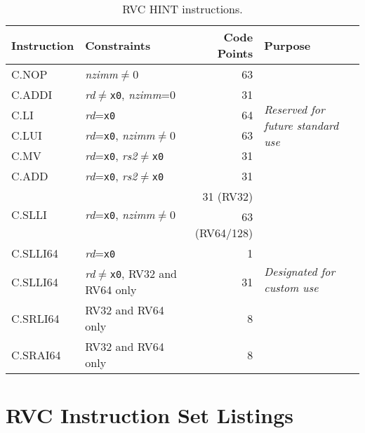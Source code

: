 \begin{table}[hbt]
\centering
\begin{tabular}{|l|l|r|l|}
  \hline
  Instruction             & Constraints                                 & Code Points & Purpose \\ \hline \hline
  C.NOP                   & {\em nzimm}$\neq$0                          & 63          & \multirow{6}{*}{\em Reserved for future standard use} \\ \cline{1-3}
  C.ADDI                  & {\em rd}$\neq${\tt x0}, {\em nzimm}=0       & 31          & \\ \cline{1-3}
  C.LI                    & {\em rd}={\tt x0}                           & 64          & \\ \cline{1-3}
  C.LUI                   & {\em rd}={\tt x0}, {\em nzimm}$\neq$0       & 63          & \\ \cline{1-3}
  C.MV                    & {\em rd}={\tt x0}, {\em rs2}$\neq${\tt x0}  & 31          & \\ \cline{1-3}
  C.ADD                   & {\em rd}={\tt x0}, {\em rs2}$\neq${\tt x0}  & 31          & \\ \hline \hline
  \multirow{2}{*}{C.SLLI} & \multirow{2}{*}{{\em rd}={\tt x0}, {\em nzimm}$\neq$0} & 31 (RV32)   & \multirow{6}{*}{\em Designated for custom use} \\
                          &                                             & 63 (RV64/128) & \\ \cline{1-3}
  C.SLLI64                & {\em rd}={\tt x0}                           & 1           & \\ \cline{1-3}
  C.SLLI64                & {\em rd}$\neq${\tt x0}, RV32 and RV64 only  & 31          & \\ \cline{1-3}
  C.SRLI64                & RV32 and RV64 only                          & 8           & \\ \cline{1-3}
  C.SRAI64                & RV32 and RV64 only                          & 8           & \\ \hline
\end{tabular}
\caption{RVC HINT instructions.}
\label{tab:rvc-hints}
\end{table}

\clearpage

\section{RVC Instruction Set Listings}

